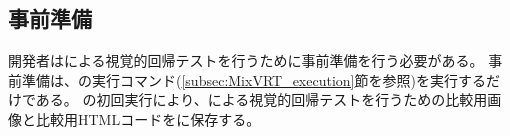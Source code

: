 \subsection{事前準備}\label{subsec:MixVRT_preparation}
開発者は\toolName による視覚的回帰テストを行うために事前準備を行う必要がある。
事前準備は、\toolName の実行コマンド(\ref{subsec:MixVRT_execution}節を参照)を実行するだけである。
\toolName の初回実行により、\toolName による視覚的回帰テストを行うための比較用画像と比較用HTMLコードを\toolName に保存する。
